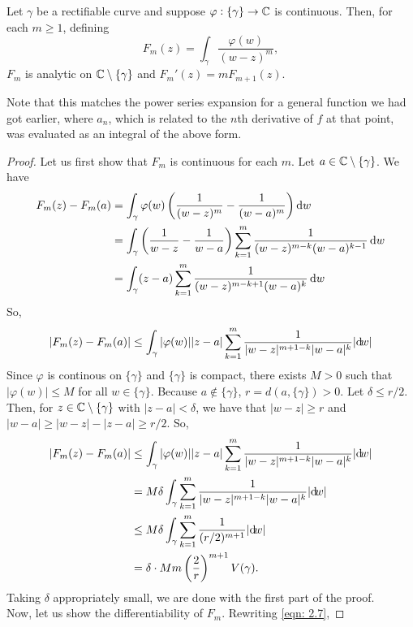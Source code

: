 		\begin{flem}
			\label{lemma 2.31: Fm}
			Let $\gamma$ be a rectifiable curve and suppose $\varphi : \{\gamma\} \to \mathbb{C}$ is continuous. Then, for each $m \ge 1$, defining
			\[ F_m(z) = \int_\gamma \frac{\varphi(w)}{(w-z)^m}, \]
			$F_m$ is analytic on $\mathbb{C}\setminus\{\gamma\}$ and $F_m'(z) = m F_{m+1}(z)$.
		\end{flem}
		Note that this matches the power series expansion for a general function we had got earlier, where $a_n$, which is related to the $n$th derivative of $f$ at that point, was evaluated as an integral of the above form.
		\begin{proof}
			Let us first show that $F_m$ is continuous for each $m$. Let $a \in \mathbb{C}\setminus\{\gamma\}$. We have
			\begin{align}
				F_m(z) - F_m(a) &= \int_\gamma \varphi(w) \left( \frac{1}{(w-z)^m} - \frac{1}{(w-a)^m} \right) \dif w \nonumber \\
					&= \int_\gamma \left( \frac{1}{w-z} - \frac{1}{w-a} \right) \sum_{k=1}^{m} \frac{1}{(w-z)^{m-k} (w-a)^{k-1}} \dif w \nonumber \\
					&= \int_\gamma (z-a) \sum_{k=1}^{m} \frac{1}{(w-z)^{m-k+1} (w-a)^{k}} \dif w \label{eqn: 2.7}
			\end{align}
			So,
			\[ |F_m(z) - F_m(a)| \le \int_\gamma |\varphi(w)| |z-a| \sum_{k=1}^m \frac{1}{|w-z|^{m+1-k}|w-a|^{k}} |{\dif} {w}| \]
			Since $\varphi$ is continous on $\{\gamma\}$ and $\{\gamma\}$ is compact, there exists $M > 0$ such that $|\varphi(w)| \le M$ for all $w \in \{\gamma\}$. Because $a\not\in\{\gamma\}$, $r = d(a,\{\gamma\}) > 0$. Let $\delta \le r/2$. Then, for $z \in \mathbb{C}\setminus\{\gamma\}$ with $|z-a| < \delta$, we have that $|w-z| \ge r$ and $|w-a| \ge |w-z| - |z-a| \ge r/2$. So,
			\begin{align*}
				|F_m(z) - F_m(a)| &\le \int_\gamma |\varphi(w)| |z-a| \sum_{k=1}^m \frac{1}{|w-z|^{m+1-k}|w-a|^{k}} |{\dif} {w}| \\
					&= M\delta \int_\gamma \sum_{k=1}^m \frac{1}{|w-z|^{m+1-k}|w-a|^{k}} |{\dif} {w}| \\
					&\le M\delta \int_\gamma \sum_{k=1}^m \frac{1}{(r/2)^{m+1}} |{\dif}{w}| \\
					&= \delta \cdot Mm \left(\frac{2}{r}\right)^{m+1} V(\gamma).
			\end{align*}
			Taking $\delta$ appropriately small, we are done with the first part of the proof.\\
			Now, let us show the differentiability of $F_m$. Rewriting \eqref{eqn: 2.7},

\end{proof}
